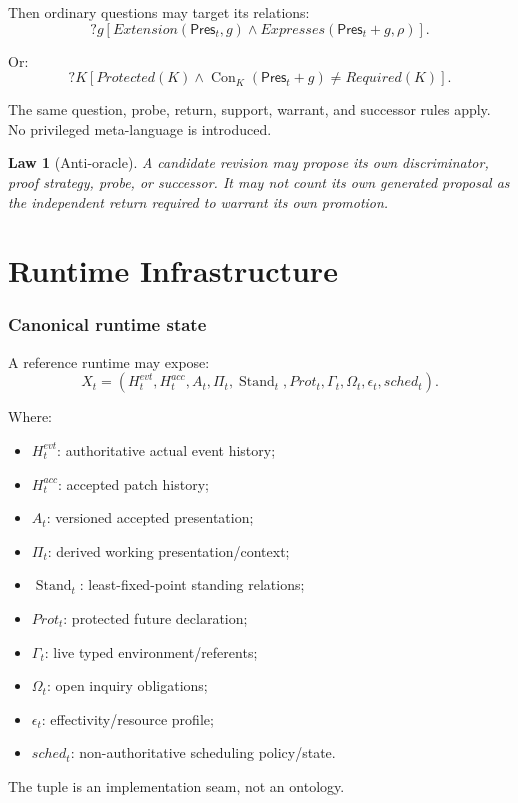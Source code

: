 \documentclass[11pt,oneside]{article}
\newtheorem{law}[definition]{Law}
\newcommand{\Con}{\operatorname{Con}}
\newcommand{\Stand}{\operatorname{Stand}}
\begin{document}
Then ordinary questions may target its relations:
\[
?g[
Extension(\mathsf{Pres}_t,g)
\land
Expresses(\mathsf{Pres}_t+g,\rho)
].
\]

Or:
\[
?K[
Protected(K)
\land
\Con_K(\mathsf{Pres}_t+g)
\neq
Required(K)
].
\]

The same question, probe, return, support, warrant, and successor rules apply.  No privileged meta-language is introduced.

\begin{law}[Anti-oracle]
A candidate revision may propose its own discriminator, proof strategy, probe, or successor.  It may not count its own generated proposal as the independent return required to warrant its own promotion.
\end{law}

\part{Runtime Infrastructure}

\section{Canonical runtime state}

A reference runtime may expose:
\[
\boxed{
X_t=
(
H_t^{evt},
H_t^{acc},
A_t,
\Pi_t,
\Stand_t,
Prot_t,
\Gamma_t,
\Omega_t,
\epsilon_t,
sched_t
).
}
\]

Where:
\begin{itemize}
\item \(H_t^{evt}\): authoritative actual event history;
\item \(H_t^{acc}\): accepted patch history;
\item \(A_t\): versioned accepted presentation;
\item \(\Pi_t\): derived working presentation/context;
\item \(\Stand_t\): least-fixed-point standing relations;
\item \(Prot_t\): protected future declaration;
\item \(\Gamma_t\): live typed environment/referents;
\item \(\Omega_t\): open inquiry obligations;
\item \(\epsilon_t\): effectivity/resource profile;
\item \(sched_t\): non-authoritative scheduling policy/state.
\end{itemize}

The tuple is an implementation seam, not an ontology.
\end{document}
